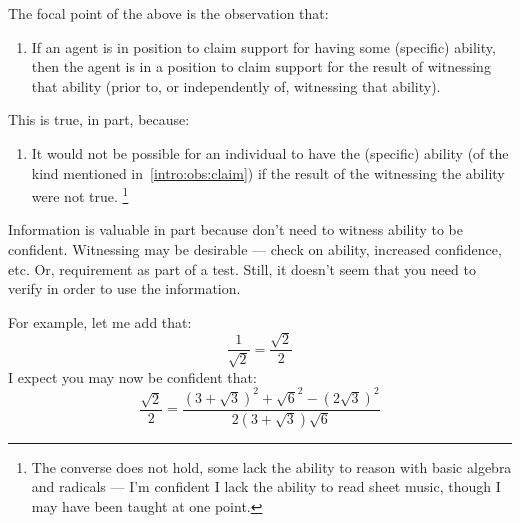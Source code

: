 \begin{note}[Focus]
  The focal point of the above is the observation that:
  \begin{enumerate}[label=(O\arabic*), ref=(O\arabic*), series=i_ob]
  \item\label{intro:obs:claim} If an agent is in position to claim support for having some (specific) ability, then the agent is in a position to claim support for the result of witnessing that ability (prior to, or independently of, witnessing that ability).
  \end{enumerate}
  This is true, in part, because:
  \begin{enumerate}[label=(O\arabic*), ref=(O\arabic*), resume*=i_ob]
  \item\label{intro:obs:entail} It would not be possible for an individual to have the (specific) ability (of the kind mentioned in~\ref{intro:obs:claim}) if the result of the witnessing the ability were not true.\nolinebreak
    \footnote{The converse does not hold, some lack the ability to reason with basic algebra and radicals --- I'm confident I lack the ability to read sheet music, though I may have been taught at one point.}
  \end{enumerate}
  Information is valuable in part because don't need to witness ability to be confident.
  Witnessing may be desirable --- check on ability, increased confidence, etc. Or, requirement as part of a test.
  Still, it doesn't seem that you need to verify in order to use the information.

  For example, let me add that:
  \[\frac{1}{\sqrt{2}} = \frac{\sqrt{2}}{2}\]
  I expect you may now be confident that:
  \[\frac{\sqrt{2}}{2} = \frac{(3 + \sqrt{3})^{2} + \sqrt{6}^{2} - (2\sqrt{3})^{2}}{2(3 + \sqrt{3})\sqrt{6}}\]
\end{note}

